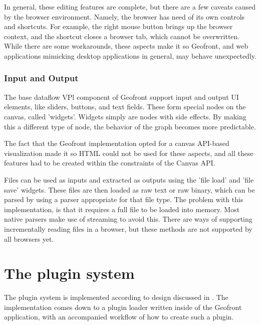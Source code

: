 In general, these editing features are complete, but there are a few caveats caused by the browser environment.
Namely, the browser has need of its own controls and shortcuts. 
For example, the right mouse button brings up the browser context, and the  shortcut closes a browser tab, which cannot be overwritten.
While there are some workarounds, these aspects make it so Geofront, and web applications mimicking desktop applications in general, may behave unexpectedly.

\subsubsection*{Input and Output}
The base dataflow VPl component of Geofront support input and output UI elements, like sliders, buttons, and text fields.
These form special nodes on the canvas, called 'widgets'. 
Widgets simply are nodes with side effects. 
By making this a different type of node, the behavior of the graph becomes more predictable.

The fact that the Geofront implementation opted for a canvas API-based visualization made it so HTML could not be used for these aspects, and all these features had to be created within the constraints of the Canvas API.

Files can be used as inputs and extracted as outputs using the 'file load' and 'file save' widgets. 
These files are then loaded as raw text or raw binary, which can be parsed by using a parser appropriate for that file type. 
The problem with this implementation, is that it requires a full file to be loaded into memory. 
Most native parsers make use of streaming to avoid this. 
There are ways of supporting incrementally reading files in a browser, but these methods are not supported by all browsers yet. 



\newpage
\section{The plugin system}
\label{sec:implementation:loading}

The plugin system is implemented according to design discussed in .
The implementation comes down to a plugin loader written inside of the Geofront application, with an accompanied workflow of how to create such a plugin. 

